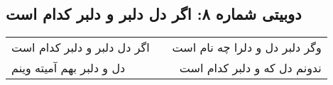 \begin{center}
\section*{دوبیتی شماره ۸: اگر دل دلبر و دلبر کدام است}
\label{sec:008}
\begin{longtable}{l p{0.5cm} r}
اگر دل دلبر و دلبر کدام است
&&
وگر دلبر دل و دلرا چه نام است
\\
دل و دلبر بهم آمیته وینم
&&
ندونم دل که و دلبر کدام است
\\
\end{longtable}
\end{center}
